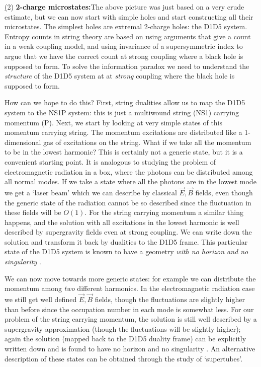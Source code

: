 \documentclass[12pt]{article}
\begin{document}
\b

(2) {\bf 2-charge microstates:}\quad The above picture was just based on a very crude estimate, but we can now start with simple holes and start constructing all their microstates. The simplest holes are extremal 2-charge holes: the D1D5 system. Entropy counts in string theory are based on using arguments that give a count in a weak coupling model, and using invariance of a supersymmetric index to argue that we have the correct count at strong coupling where a black hole is supposed to form. To solve the information paradox we need to understand the {\it structure} of the D1D5 system at at {\it strong} coupling where the black hole is supposed to form. 

How can we hope to do this? First, string dualities allow us to map the D1D5 system to the NS1P system: this is just a multiwound string (NS1) carrying momentum (P). Next, we start by looking at very simple states of this momentum carrying string. The momentum excitations are distributed like a 1-dimensional gas of excitations on the string. What if we take all the momentum to be in the lowest harmonic? This is certainly not a generic state, but it is a convenient starting point. It is analogous to studying the problem of electromagnetic radiation in a box, where the photons can be distributed among all normal modes. If we take a state where all the photons are in the lowest mode we get a `laser beam' which we can describe by classical $\vec E, \vec B$ fields, even though the generic state of the radiation cannot be so described since the fluctuation in these fields will be $O(1)$. For the string carrying momentum a similar thing happens, and the solution with all excitations in the lowest harmonic  is well described by supergravity fields even at strong coupling. We can write down the solution and transform it back by dualities to the D1D5 frame. This particular state of the D1D5 system is known to have a geometry {\it with no horizon and no singularity} \cite{bal}.

We can now move towards more generic states: for example we can distribute the momentum among {\it two} different harmonics. In the electromagnetic radiation case we still get well defined $\vec E, \vec B$ fields, though the fluctuations are slightly higher than before since the occupation number in each mode is somewhat less. For our problem of the string carrying momentum, the solution is still well described by a supergravity approximation (though the fluctuations will be slightly higher); again the solution (mapped back to the D1D5 duality frame)  can be explicitly written down and is found to have no horizon and no singularity \cite{lm4,lmm,internal}. 
An alternative description of these states can be obtained through the study of `supertubes'. 
\end{document}

